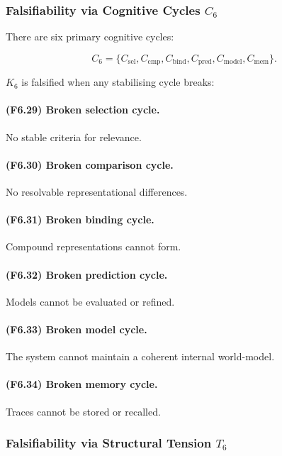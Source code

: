 \subsubsection{Falsifiability via Cognitive Cycles \texorpdfstring{$C_6$}{C_6}}

There are six primary cognitive cycles:

\[
C_6 = \{
C_{\mathrm{sel}}, C_{\mathrm{cmp}}, C_{\mathrm{bind}},
C_{\mathrm{pred}}, C_{\mathrm{model}}, C_{\mathrm{mem}}
\}.
\]

$K_6$ is falsified when any stabilising cycle breaks:

\paragraph{(F6.29) Broken selection cycle.}
No stable criteria for relevance.

\paragraph{(F6.30) Broken comparison cycle.}
No resolvable representational differences.

\paragraph{(F6.31) Broken binding cycle.}
Compound representations cannot form.

\paragraph{(F6.32) Broken prediction cycle.}
Models cannot be evaluated or refined.

\paragraph{(F6.33) Broken model cycle.}
The system cannot maintain a coherent internal world-model.

\paragraph{(F6.34) Broken memory cycle.}
Traces cannot be stored or recalled.



\subsubsection{Falsifiability via Structural Tension \texorpdfstring{$T_6$}{T_6}}

